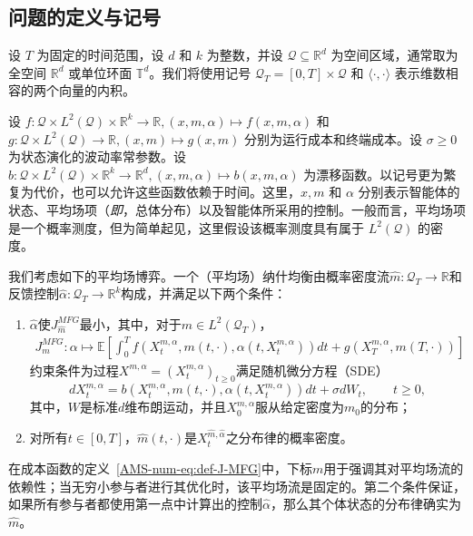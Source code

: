 \documentclass{amsproc}
\theoremstyle{definition}
\theoremstyle{remark}
\numberwithin{equation}{section}
\newcommand{\EE}{{\mathbb E}}
\newcommand{\RR}{{\mathbb R}}
\newcommand{\TT}{{\mathbb T}}
\newcommand{\ctrl}{\alpha}
\newcommand{\ctrldim}{k}
\newcommand{\dom}{\mathcal{Q}}
\newcommand{\domT}{\mathcal{Q}_{T}}
\begin{document}
\subsection{问题的定义与记号}

设 $T$ 为固定的时间范围，设 $d$ 和 $\ctrldim$ 为整数，并设 $\dom \subseteq \RR^d$ 为空间区域，通常取为全空间 $\RR^d$ 或单位环面 $\TT^d$。我们将使用记号 $\domT = [0,T] \times \dom$ 和 $\langle \cdot, \cdot \rangle$ 表示维数相容的两个向量的内积。

设 $f: \dom \times L^2(\dom) \times \RR^\ctrldim \to \RR, (x,m,\ctrl) \mapsto f(x,m,\ctrl)$ 和 $g: \dom \times L^2(\dom) \to \RR, (x,m) \mapsto g(x,m)$ 分别为运行成本和终端成本。设 $\sigma \ge 0$ 为状态演化的波动率常参数。设 $b:  \dom \times L^2(\dom) \times \RR^\ctrldim \to \RR^d, (x,m,\ctrl) \mapsto b(x,m,\ctrl)$ 为漂移函数。以记号更为繁复为代价，也可以允许这些函数依赖于时间。这里，$x,m$ 和 $\ctrl$ 分别表示智能体的状态、平均场项（\textit{即}，总体分布）以及智能体所采用的控制。一般而言，平均场项是一个概率测度，但为简单起见，这里假设该概率测度具有属于 $L^2(\dom)$ 的密度。

我们考虑如下的平均场博弈。一个（平均场）纳什均衡由概率密度流$\hat{m}: \domT \to \RR$和反馈控制$\hat{\ctrl}: \domT\to \RR^\ctrldim$构成，并满足以下两个条件：
\begin{enumerate}
	\item $\hat{\ctrl}$使$J^{MFG}_{\hat{m}}$最小，其中，对于$m \in L^2(\domT)$，
\begin{align}
\label{AMS-num-eq:def-J-MFG}
	J^{MFG}_{m}: \ctrl \mapsto  \EE \left[\int_0^T f(X_t^{m, \ctrl}, m(t, \cdot), \ctrl(t,X_t^{m, \ctrl}) ) dt + g(X_T^{m, \ctrl}, m(T,\cdot)) \right]
\end{align}
约束条件为过程$X^{m, \ctrl} = (X_t^{m, \ctrl})_{t \ge 0}$满足随机微分方程（SDE）
\begin{equation}
\label{AMS-num-eq:dyn-X-general-MFG}
	d X_t^{m, \ctrl} = b(X_t^{m, \ctrl}, m(t,\cdot), \ctrl(t, X_t^{m, \ctrl})) dt + \sigma d W_t, \qquad t \ge 0,
\end{equation}
其中，$W$是标准$d$维布朗运动，并且$X_0^{m, \ctrl}$服从给定密度为$m_0$的分布；
	\item 对所有$t \in [0,T]$，$\hat{m}(t,\cdot)$是$X_t^{\hat{m}, \hat{\ctrl}}$之分布律的概率密度。
\end{enumerate}
在成本函数的定义~\eqref{AMS-num-eq:def-J-MFG}中，下标$m$用于强调其对平均场流的依赖性；当无穷小参与者进行其优化时，该平均场流是固定的。第二个条件保证，如果所有参与者都使用第一点中计算出的控制$\hat{\ctrl}$，那么其个体状态的分布律确实为$\hat{m}$。
\end{document}
